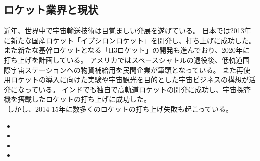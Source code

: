 \subsection{ロケット業界と現状}
近年、世界中で宇宙輸送技術は目覚ましい発展を遂げている。
日本では2013年に新たな国産ロケット「イプシロンロケット」を開発し、打ち上げに成功した。また新たな基幹ロケットとなる「H3ロケット」の開発も進んでおり、2020年に打ち上げを計画している。
アメリカではスペースシャトルの退役後、低軌道国際宇宙ステーションへの物資補給用を民間企業が筆頭となっている。
また再使用ロケットの導入に向けた実験や宇宙観光を目的とした宇宙ビジネスの構想が活発になっている。
インドでも独自で高軌道ロケットの開発に成功し、宇宙探査機を搭載したロケットの打ち上げに成功した。
\\
\
しかし、2014-15年に数多くのロケットの打ち上げ失敗も起こっている。



\begin{itemize}
	\item
	\item
	\item
	\item
\end{itemize}
